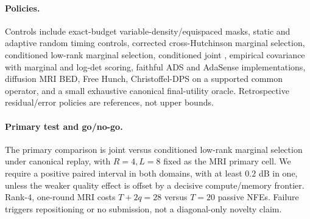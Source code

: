\paragraph{Policies.}
Controls include exact-budget variable-density/equispaced masks, static and
adaptive random timing controls, corrected cross-Hutchinson marginal
selection, conditioned low-rank marginal selection, conditioned joint
\method{}, empirical covariance with marginal and log-det scoring, faithful
ADS and AdaSense implementations, diffusion MRI BED, Free Hunch,
Christoffel-DPS on a supported common operator, and a small exhaustive
canonical final-utility oracle.  Retrospective residual/error policies are
references, not upper bounds.

\begin{table}[t]
\centering
\caption{Primary canonical final-mask comparison.  No cell is populated until
the corrected artifact passes provenance and statistical review.}
\label{tab:main}
\small
{}
\end{table}

\paragraph{Primary test and go/no-go.}
The primary comparison is joint versus conditioned low-rank marginal
selection under canonical replay, with $R=4,L=8$ fixed as the MRI primary
cell.  We require a positive paired interval in both domains, with at least
$0.2$ dB in one, unless the weaker quality effect is offset by a decisive
compute/memory frontier.  Rank-$4$, one-round MRI
costs $T+2q=28$ versus $T=20$ passive NFEs.  Failure triggers repositioning or
no submission, not a diagonal-only novelty claim.
